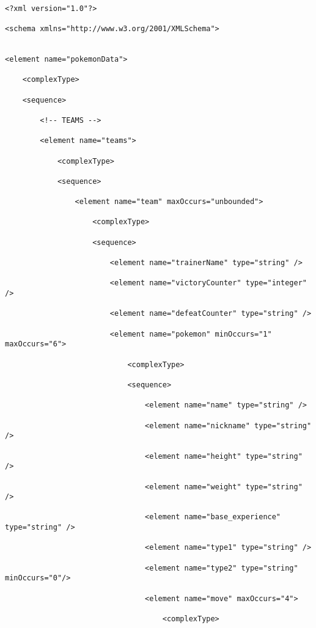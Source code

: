 \lstset{language=XML}
\begin{lstlisting}

<?xml version="1.0"?>

<schema xmlns="http://www.w3.org/2001/XMLSchema">


<element name="pokemonData">

    <complexType>

    <sequence>

        <!-- TEAMS -->

        <element name="teams">

            <complexType>

            <sequence>

                <element name="team" maxOccurs="unbounded">

                    <complexType>

                    <sequence>

                        <element name="trainerName" type="string" />

                        <element name="victoryCounter" type="integer" />

                        <element name="defeatCounter" type="string" />

                        <element name="pokemon" minOccurs="1" maxOccurs="6">

                            <complexType>

                            <sequence>

                                <element name="name" type="string" />

                                <element name="nickname" type="string" />

                                <element name="height" type="string" />

                                <element name="weight" type="string" />

                                <element name="base_experience" type="string" />

                                <element name="type1" type="string" />

                                <element name="type2" type="string" minOccurs="0"/>

                                <element name="move" maxOccurs="4">

                                    <complexType>


\end{lstlisting}

